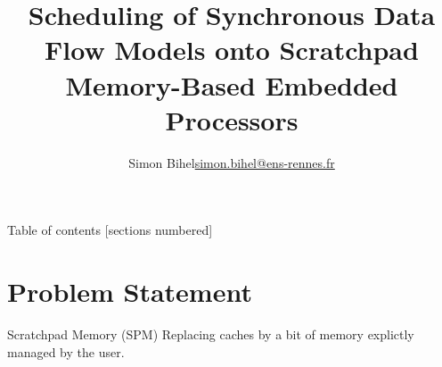 \documentclass{beamer}
\title{Scheduling of Synchronous Data Flow Models onto Scratchpad Memory-Based Embedded Processors}
\date{\displaydate{defensedate}}
\author{%
  Simon Bihel\hfill\url{simon.bihel@ens-rennes.fr} \\
}
\institute{%
  University of Rennes I \\
  \'Ecole Normale Sup\'erieure de Rennes
}
\begin{document}
\maketitle

\begin{frame}{Table of contents}
  [sections numbered]
  \tableofcontents[hideallsubsections]
\end{frame}


\section{Problem Statement}

\begin{frame}{Scratchpad Memory (SPM)}
  Replacing caches by a bit of memory explictly managed by the user.
\end{frame}
\end{document}

